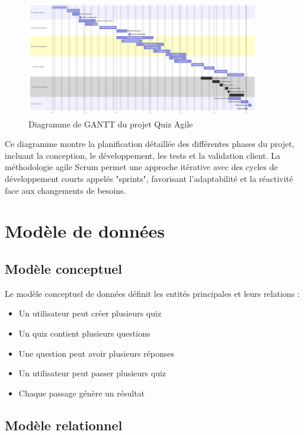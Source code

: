 \documentclass[12pt,a4paper]{report}
\begin{document}
\begin{figure}[H]
\centering
\includegraphics[width=0.9\textwidth]{latex_media/media/image10.png}
\caption{Diagramme de GANTT du projet Quiz Agile}
\label{fig:gantt-quiz-agile}
\end{figure}

Ce diagramme montre la planification détaillée des différentes phases du projet, incluant la conception, le développement, les tests et la validation client. La méthodologie agile Scrum permet une approche itérative avec des cycles de développement courts appelés "sprints", favorisant l'adaptabilité et la réactivité face aux changements de besoins.

\section{Modèle de données}

\subsection{Modèle conceptuel}

Le modèle conceptuel de données définit les entités principales et leurs relations :

\begin{itemize}
    \item Un utilisateur peut créer plusieurs quiz
    \item Un quiz contient plusieurs questions
    \item Une question peut avoir plusieurs réponses
    \item Un utilisateur peut passer plusieurs quiz
    \item Chaque passage génère un résultat
\end{itemize}

\subsection{Modèle relationnel}
\end{document}
